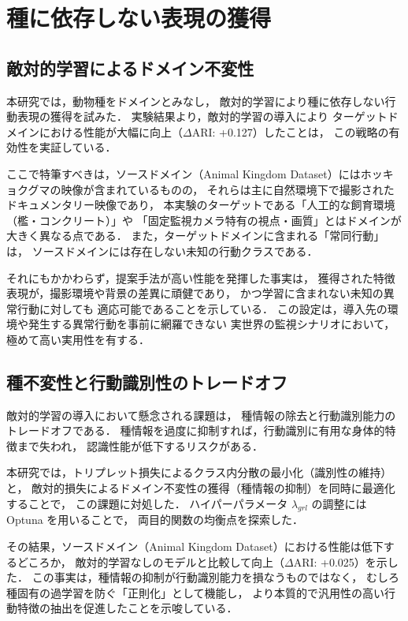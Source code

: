 \section{種に依存しない表現の獲得}

\subsection{敵対的学習によるドメイン不変性}
本研究では，動物種をドメインとみなし，
敵対的学習により種に依存しない行動表現の獲得を試みた．
実験結果より，敵対的学習の導入により
ターゲットドメインにおける性能が大幅に向上（$\Delta$ARI: +0.127）したことは，
この戦略の有効性を実証している．

ここで特筆すべきは，ソースドメイン（Animal Kingdom Dataset）にはホッキョクグマの映像が含まれているものの，
それらは主に自然環境下で撮影されたドキュメンタリー映像であり，
本実験のターゲットである「人工的な飼育環境（檻・コンクリート）」や
「固定監視カメラ特有の視点・画質」とはドメインが大きく異なる点である．
また，ターゲットドメインに含まれる「常同行動」は，
ソースドメインには存在しない未知の行動クラスである．

それにもかかわらず，提案手法が高い性能を発揮した事実は，
獲得された特徴表現が，撮影環境や背景の差異に頑健であり，
かつ学習に含まれない未知の異常行動に対しても
適応可能であることを示している．
この設定は，導入先の環境や発生する異常行動を事前に網羅できない
実世界の監視シナリオにおいて，極めて高い実用性を有する．

\subsection{種不変性と行動識別性のトレードオフ}
敵対的学習の導入において懸念される課題は，
種情報の除去と行動識別能力のトレードオフである．
種情報を過度に抑制すれば，行動識別に有用な身体的特徴まで失われ，
認識性能が低下するリスクがある．

本研究では，トリプレット損失によるクラス内分散の最小化（識別性の維持）と，
敵対的損失によるドメイン不変性の獲得（種情報の抑制）を同時に最適化することで，
この課題に対処した．
ハイパーパラメータ $\lambda_{grl}$ の調整には Optuna を用いることで，
両目的関数の均衡点を探索した．

その結果，ソースドメイン（Animal Kingdom Dataset）における性能は低下するどころか，
敵対的学習なしのモデルと比較して向上（$\Delta$ARI: +0.025）を示した．
この事実は，種情報の抑制が行動識別能力を損なうものではなく，
むしろ種固有の過学習を防ぐ「正則化」として機能し，
より本質的で汎用性の高い行動特徴の抽出を促進したことを示唆している．

